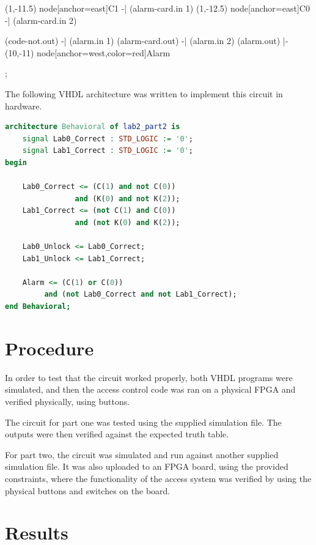 \documentclass{article}
\begin{document}
\begin{circuitikz}[scale=0.75, transform shape]
            (1,-11.5) node[anchor=east]{C1} -| (alarm-card.in 1)
            (1,-12.5) node[anchor=east]{C0} -| (alarm-card.in 2)

            (code-not.out) -| (alarm.in 1)
            (alarm-card.out) -| (alarm.in 2)
            (alarm.out) |- (10,-11) node[anchor=west,color=red]{Alarm}

        ;
    \end{circuitikz}

    The following VHDL architecture was written to implement this circuit in hardware.

    \begin{lstlisting}[language=VHDL]
architecture Behavioral of lab2_part2 is
    signal Lab0_Correct : STD_LOGIC := '0';
    signal Lab1_Correct : STD_LOGIC := '0';
begin

    Lab0_Correct <= (C(1) and not C(0))
                and (K(0) and not K(2));
    Lab1_Correct <= (not C(1) and C(0))
                and (not K(0) and K(2));
    
    Lab0_Unlock <= Lab0_Correct;
    Lab1_Unlock <= Lab1_Correct;
    
    Alarm <= (C(1) or C(0))
         and (not Lab0_Correct and not Lab1_Correct);
end Behavioral;
    \end{lstlisting}
    \newpage

    \section{Procedure}
    In order to test that the circuit worked properly,
    both VHDL programs were simulated, and then the
    access control code was ran on a physical FPGA and verified physically,
    using buttons.

    The circuit for part one was tested using the supplied
    simulation file. The outputs were then verified against the expected truth table.

    For part two, the circuit was simulated and run against another
    supplied simulation file. It was also uploaded to an FPGA
    board, using the provided constraints, where the functionality
    of the access system was verified by using the physical buttons and switches on
    the board.


    \section{Results}
\end{document}
